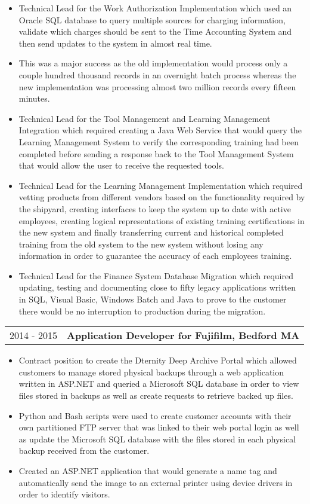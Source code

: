 \documentclass[11pt, letterpaper]{article}
\begin{document}
\begin{itemize}[itemsep=0cm, parsep=0.2cm]
    \item Technical Lead for the Work Authorization Implementation which used an Oracle SQL database to query multiple sources for charging information, validate which charges should be sent to the Time Accounting System and then send updates to the system in almost real time.
    \item This was a major success as the old implementation would process only a couple hundred thousand records in an overnight batch process whereas the new implementation was processing almost two million records every fifteen minutes.
    \item Technical Lead for the Tool Management and Learning Management Integration which required creating a Java Web Service that would query the Learning Management System to verify the corresponding training had been completed before sending a response back to the Tool Management System that would allow the user to receive the requested tools.
    \item Technical Lead for the Learning Management Implementation which required vetting products from different vendors based on the functionality required by the shipyard, creating interfaces to keep the system up to date with active employees, creating logical representations of existing training certifications in the new system and finally transferring current and historical completed training from the old system to the new system without losing any information in order to guarantee the accuracy of each employees training.
    \item Technical Lead for the Finance System Database Migration which required updating, testing and documenting close to fifty legacy applications written in SQL, Visual Basic, Windows Batch and Java to prove to the customer there would be no interruption to production during the migration.
\end{itemize}
\begin{tabular}{p{0.76in}|p{6.24in}}
    2014 - 2015 & \textbf{Application Developer for Fujifilm, Bedford MA}
\end{tabular}
\begin{itemize}[itemsep=0cm, parsep=0.2cm]
    \item Contract position to create the Dternity Deep Archive Portal which allowed customers to manage stored physical backups through a web application written in ASP.NET and queried a Microsoft SQL database in order to view files stored in backups as well as create requests to retrieve backed up files.
    \item Python and Bash scripts were used to create customer accounts with their own partitioned FTP server that was linked to their web portal login as well as update the Microsoft SQL database with the files stored in each physical backup received from the customer.
    \item Created an ASP.NET application that would generate a name tag and automatically send the image to an external printer using device drivers in order to identify visitors.
\end{itemize}
\vspace{-0.8cm}
\end{document}
